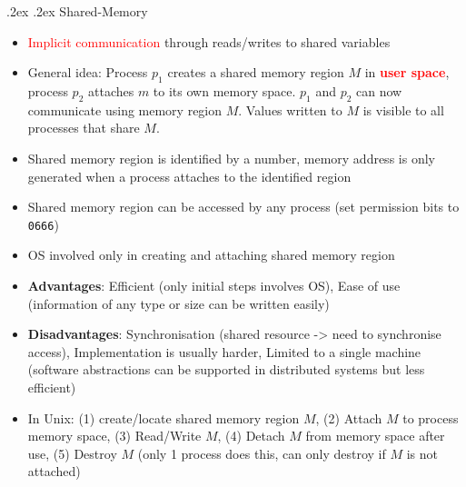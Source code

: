 \documentclass[13pt,landscape,a4paper]{article}
\makeatletter
\renewcommand{\subsection}{\@startsection{subsection}{1}{0mm}%
    {.2ex}%
    {.2ex}%
    {\sffamily\bfseries}}
\makeatother
\begin{document}
\begin{multicols*}{3}
        \subsection{Shared-Memory}
        \begin{itemize}
            \item \textcolor{red}{Implicit communication} through reads/writes to shared variables
            \item General idea: Process $p_1$ creates a shared memory region $M$ in \textbf{\textcolor{red}{user space}}, process $p_2$ attaches $m$ to its own memory space. $p_1$ and $p_2$ can now communicate using memory region $M$. Values written to $M$ is visible to all processes that share $M$.
            \item Shared memory region is identified by a number, memory address is only generated when a process attaches to the identified region
            \item Shared memory region can be accessed by any process (set permission bits to \texttt{0666})
            \item OS involved only in creating and attaching shared memory region
            \item \textbf{Advantages}: Efficient (only initial steps involves OS), Ease of use (information of any type or size can be written easily)
            \item \textbf{Disadvantages}: Synchronisation (shared resource -> need to synchronise access), Implementation is usually harder, Limited to a single machine (software abstractions can be supported in distributed systems but less efficient)
            \item In Unix: (1) create/locate shared memory region $M$, (2) Attach $M$ to process memory space, (3) Read/Write $M$, (4) Detach $M$ from memory space after use, (5) Destroy $M$ (only 1 process does this, can only destroy if $M$ is not attached)
        \end{itemize}

\end{multicols*}
\end{document}

